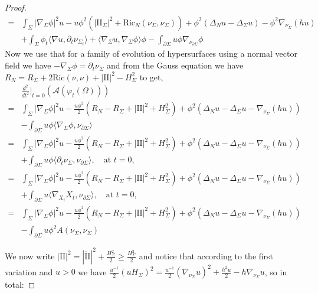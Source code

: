 \documentclass[10pt,a4paper]{amsart}
\newcommand{\Ric}{\text{Ric}}
\newcommand{\p}{\partial}
\newcommand{\sff}{\mathrm{I\!I}}
\begin{document}
\begin{proof}
\begin{align*}
			=&\int_{\Sigma} |\nabla_{\Sigma} \phi|^2u  -u\phi^2(|\sff_{\Sigma}|^2+\Ric_N(\nu_{\Sigma},\nu_{\Sigma}))+ \phi^2 (\Delta_N u-\Delta_{\Sigma}u)-\phi^2\nabla_{\nu_{\Sigma}} (hu)\\
			&+ \int_{\Sigma} \phi_t \langle\nabla u,\p_t \nu_{\Sigma_t}\rangle +\langle \nabla_{\Sigma} u, \nabla_{\Sigma} \phi \rangle \phi   -\int_{\partial \Sigma} u\phi \nabla_{\nu_{\partial \Sigma}} \phi
		\end{align*}
		Now we use that for a family of evolution of hypersurfaces using a normal vector field we have $-\nabla_{\Sigma} \phi=\partial_t \nu_{\Sigma}$ and from the Gauss equation we have $R_N=R_{\Sigma}+2\Ric(\nu,\nu)+|\sff|^2-H^2_{\Sigma}$ to get,
		\begin{align*}
			&\frac{d^2}{dt^2}\Big\vert_{t=0}(\mathcal{A}(\varphi_t(\Omega)))\\
			=& \int_{\Sigma} |\nabla_{\Sigma} \phi|^2u  -\frac{u\phi^2}{2}(R_{N}-R_{\Sigma}+|\sff|^2+H^2_{\Sigma})+ \phi^2 (\Delta_N u-\Delta_{\Sigma}u-\nabla_{\nu_{\Sigma}} (hu))\\
			&-\int_{\partial \Sigma} u\phi \langle \nabla_{\Sigma}\phi, \nu_{\partial \Sigma}\rangle\\
			=&\int_{\Sigma} |\nabla_{\Sigma} \phi|^2u  -\frac{u\phi^2}{2}(R_{N}-R_{\Sigma}+|\sff|^2+H^2_{\Sigma})+ \phi^2 (\Delta_N u-\Delta_{\Sigma}u-\nabla_{\nu_{\Sigma}} (hu))\\
			&+ \int_{\partial \Sigma} u\phi \langle \partial_t \nu_{\Sigma}, \nu_{\p \Sigma} \rangle ,\quad \text{at } t=0, \\
			=&\int_{\Sigma} |\nabla_{\Sigma} \phi|^2u  -\frac{u\phi^2}{2}(R_{N}-R_{\Sigma}+|\sff|^2+H^2_{\Sigma})+ \phi^2 (\Delta_N u-\Delta_{\Sigma}u-\nabla_{\nu_{\Sigma}} (hu))\\
			& + \int_{\partial \Sigma} u  \langle \nabla_{X_t} X_t, \nu_{\p \Sigma} \rangle ,\quad \text{at } t=0, \\
			=&\int_{\Sigma} |\nabla_{\Sigma} \phi|^2u  -\frac{u\phi^2}{2}(R_{N}-R_{\Sigma}+|\sff|^2+H^2_{\Sigma})+ \phi^2 (\Delta_N u-\Delta_{\Sigma}u-\nabla_{\nu_{\Sigma}} (hu))\\
			& - \int_{\partial \Sigma} u  \phi^2 A(\nu_{\Sigma},\nu_{\Sigma})
		\end{align*}
		
		We now write $|\sff|^2=|\mathring{\sff}|^2+\frac{H^2_{\Sigma}}{2}\geq  \frac{H^2_{\Sigma}}{2}$ 
		and notice that according to the first variation and $u>0$ we have $\frac{u^{-1}}{2}(uH_{\Sigma})^2=\frac{u^{-1}}{2}(\nabla_{\nu_{\Sigma}}u)^2+\frac{h^2u}{2}-h\nabla_{\nu_{\Sigma}}u$, so in total:


\end{proof}
\end{document}
